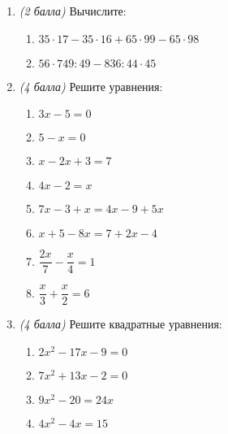 \documentclass[12pt, a4paper]{article}
\begin{document}
	
	
	\begin{enumerate}
		\item \textit{(2 балла)} Вычислите:
		\begin{multicols}{2}
		\begin{enumerate}[label=\asbuk*)]
			\item $35\cdot 17 - 35 \cdot 16 +65 \cdot 99 - 65 \cdot 98$
			\item $56 \cdot 749:49-836:44\cdot45$
		\end{enumerate}
		\end{multicols}
		\item \textit{(4 балла)} Решите уравнения:
		\begin{multicols}{2}
			\begin{enumerate}[label=\asbuk*)]
				\item $3x-5=0$
				\item $5-x=0$
				\item $x-2x+3=7$
				\item $4x-2=x$
				\item $7x-3+x=4x-9+5x$
				\item $x+5-8x=7+2x-4$
				\item $\dfrac{2x}{7}-\dfrac{x}{4}=1$
				\item $\dfrac{x}{3}+\dfrac{x}{2}=6$
			\end{enumerate}
		\end{multicols}
		\item \textit{(4 балла)} Решите квадратные уравнения:
		\begin{multicols}{2}
			\begin{enumerate}[label=\asbuk*)]
				\item $2x^2-17x-9=0$
				\item $7x^2+13x-2=0$
				\item $9x^2-20=24x$
				\item $4x^2-4x=15$
			\end{enumerate}
		\end{multicols}
	\end{enumerate}
	
\end{document}
